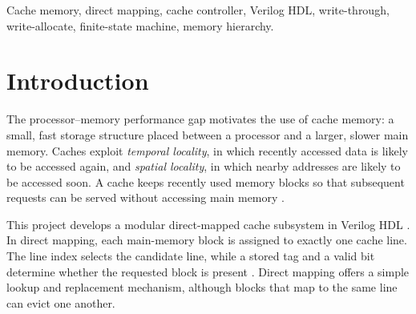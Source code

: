 \documentclass[conference,a4paper]{IEEEtran}
\begin{document}
\begin{abstract}\label{sec:abs}
This paper presents the design and Phase~I verification of a 32-bit direct-mapped cache subsystem that reduces average memory-access latency by exploiting temporal and spatial locality. The cache holds 1~KiB as 64 lines of 16-byte blocks (four 32-bit words per line), with a 22-bit tag, 6-bit index and 4-bit offset, and uses write-through and write-allocate policies. The modular Verilog RTL comprises an address decoder, cache storage, an FSM controller, a behavioral main-memory model and a performance monitor. Verification records 374 decoder checks, unit tests for every module, and 39 integrated checks passing with no failures over a 26-access directed sequence (13 hits, 13 misses), supported by eight waveform scenarios. Waveform measurements give completion latencies of 2, 11, 9 and 18 cycles for a read hit, read miss, write hit and write miss. A trace-driven functional model of three read workloads yields hit rates of 80\% (sequential), 93.75\% (repeated block) and 0\% (conflict thrashing), corresponding to analytical average memory access times of 2.00, 1.3125 and 6.00 cycles under an assumed 1-cycle hit time and 5-cycle miss penalty; these are analytical estimates, not measured RTL latency. FPGA synthesis, resource utilization and maximum frequency remain pending, so no hardware area or timing claims are made.
\end{abstract}

\begin{IEEEkeywords}
Cache memory, direct mapping, cache controller, Verilog HDL, write-through, write-allocate, finite-state machine, memory hierarchy.
\end{IEEEkeywords}

\section{Introduction}\label{sec:intro}
The processor--memory performance gap motivates the use of cache memory: a small, fast storage structure placed between a processor and a larger, slower main memory. Caches exploit \emph{temporal locality}, in which recently accessed data is likely to be accessed again, and \emph{spatial locality}, in which nearby addresses are likely to be accessed soon. A cache keeps recently used memory blocks so that subsequent requests can be served without accessing main memory \cite{patterson,arm}.

This project develops a modular direct-mapped cache subsystem in Verilog HDL \cite{verilog}. In direct mapping, each main-memory block is assigned to exactly one cache line. The line index selects the candidate line, while a stored tag and a valid bit determine whether the requested block is present \cite{patterson,arm}. Direct mapping offers a simple lookup and replacement mechanism, although blocks that map to the same line can evict one another.
\end{document}
